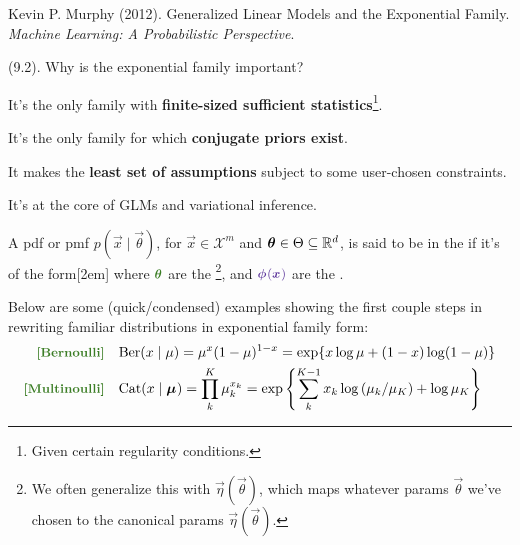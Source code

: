 \documentclass[11pt]{article}
\begin{document}

\vspace{-1.7em}
{\scriptsize Kevin P. Murphy (2012). Generalized Linear Models and the Exponential Family.\\ \textit{Machine Learning: A Probabilistic Perspective}.\\ }

\p {} (9.2). Why is the exponential family important?
\begin{compactitem}
	\item It's the only family with \textbf{finite-sized sufficient statistics}\footnote{Given certain regularity conditions.}. 
	\item It's the only family for which \textbf{conjugate priors exist}.
	\item It makes the \textbf{least set of assumptions} subject to some user-chosen constraints.
	\item It's at the core of GLMs and variational inference. 
\end{compactitem}
\begin{definition}
	A pdf or pmf $p(\vec x \mid \vec\theta)$, for $\vec x \in \mathcal{X}^m$ and $\bm{\theta}_{} \in \Theta \subseteq \mathbb{R}^d$, is said to be in the  if it's of the form[2em]
where $ \mgreen{\vec\theta}$ are the \footnote{We often generalize this with $\vec{\eta}(\vec\theta)$, which maps whatever params $\vec\theta$ we've chosen to the canonical params $\vec{\eta}(\vec\theta)$.}, and $\mpurple{\vec{\phi}(\vec x)}$ are the . 
\end{definition}
Below are some (quick/condensed) examples showing the first couple steps in rewriting familiar distributions in exponential family form:
\begin{align}
	\mtgreen{[Bernoulli]}&\quad \text{Ber}(x \mid \mu)
		= \mu^x (1 - \mu)^{1- x} = \exp\{  x \log \mu + (1 - x) \log(1- \mu)   \}  \\
	\mtgreen{[Multinoulli]}&\quad \text{Cat}(x \mid \vec\mu)
		= \prod_k^K \mu_k^{x_k} = \exp\left\{  \sum_k^{K-1} x_k \log\left(\mu_k/\mu_K \right) + \log\mu_K  \right\} 
\end{align}
\end{document}
